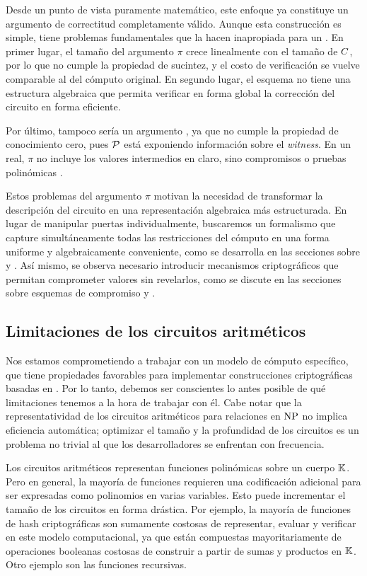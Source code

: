 Desde un punto de vista puramente matemático, este enfoque ya constituye un argumento de correctitud completamente válido. Aunque esta construcción es simple, tiene problemas fundamentales que la hacen inapropiada para un \SNARK. En primer lugar, el tamaño del argumento $\pi$ crece linealmente con el tamaño de $C$, por lo que no cumple la propiedad de sucintez, y el costo de verificación se vuelve comparable al del cómputo original. En segundo lugar, el esquema no tiene una estructura algebraica que permita verificar en forma global la corrección del circuito en forma eficiente.

Por último, tampoco sería un argumento \ZK, ya que no cumple la propiedad de conocimiento cero, pues $\mathcal{P}$ está exponiendo información sobre el \textit{witness}. En un \SNARK real, $\pi$ no incluye los valores intermedios en claro, sino compromisos o pruebas polinómicas \cite{Parno2016}.

Estos problemas del argumento $\pi$ motivan la necesidad de transformar la descripción del circuito en una representación algebraica más estructurada. En lugar de manipular puertas individualmente, buscaremos un formalismo que capture simultáneamente todas las restricciones del cómputo en una forma uniforme y algebraicamente conveniente, como se desarrolla en las secciones sobre \ROneCS y \QAP. Así mismo, se observa necesario introducir mecanismos criptográficos que permitan comprometer valores sin revelarlos, como se discute en las secciones sobre esquemas de compromiso y \KZG.

\subsection{Limitaciones de los circuitos aritméticos}
\label{subsec:apendice-b-arithmetic-circuits-limitaciones-de-los-circuitos-aritmeticos}

Nos estamos comprometiendo a trabajar con un modelo de cómputo específico, que tiene propiedades favorables para implementar construcciones criptográficas basadas en \SNARK. Por lo tanto, debemos ser conscientes lo antes posible de qué limitaciones tenemos a la hora de trabajar con él. Cabe notar que la representatividad de los circuitos aritméticos para relaciones en $\mathrm{NP}$ no implica eficiencia automática; optimizar el tamaño y la profundidad de los circuitos es un problema no trivial al que los desarrolladores se enfrentan con frecuencia.

Los circuitos aritméticos representan funciones polinómicas sobre un cuerpo $\mathbb{K}$. Pero en general, la mayoría de funciones requieren una codificación adicional para ser expresadas como polinomios en varias variables. Esto puede incrementar el tamaño de los circuitos en forma drástica. Por ejemplo, la mayoría de funciones de hash criptográficas son sumamente costosas de representar, evaluar y verificar en este modelo computacional, ya que están compuestas mayoritariamente de operaciones booleanas costosas de construir a partir de sumas y productos en $\mathbb{K}$. Otro ejemplo son las funciones recursivas.

